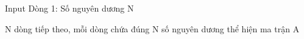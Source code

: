 Input
Dòng 1: Số nguyên dương N

N dòng tiếp theo, mỗi dòng chứa đúng N số nguyên dương thể hiện ma trận A